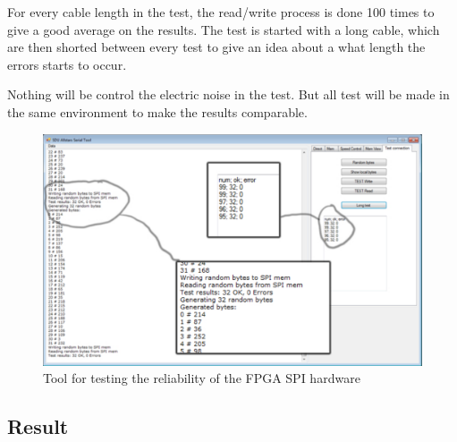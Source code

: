 For every cable length in the test, the read/write process is done 100 times to give a good average on the results. The test is started with a long cable, which are then shorted between every test to give an idea about a what length the errors starts to occur.

Nothing will be control the electric noise in the test. But all test will be made in the same environment to make the results comparable.

\begin{figure}[htb] 
	\begin{center}
	\includegraphics[scale=0.6,trim=0 0 0 0]{graphics/spi_testapplication.pdf} %
	\caption{Tool for testing the reliability of the FPGA SPI hardware}
	\label{fig:spi_testapplication}			%
	\end{center}
\end{figure}


\subsection{Result}

